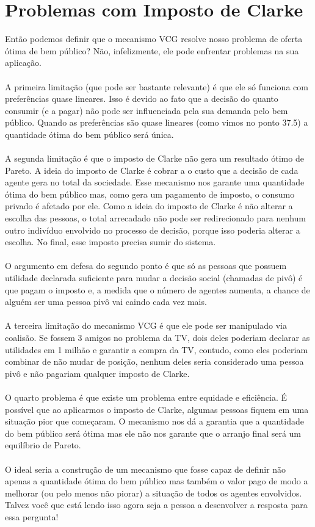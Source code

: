\documentclass[a4paper,11pt,oneside]{book}
\theoremstyle{definition}
\theoremstyle{break}
\begin{document}
\section{Problemas com Imposto de Clarke}

Então podemos definir que o mecanismo VCG resolve nosso problema de oferta ótima de bem público? Não, infelizmente, ele pode enfrentar problemas na sua aplicação.
\\~\\
A primeira limitação (que pode ser bastante relevante) é que ele só funciona com preferências quase lineares. Isso é devido ao fato que a decisão do quanto consumir (e a pagar) não pode ser influenciada pela sua demanda pelo bem público. Quando as preferências são quase lineares (como vimos no ponto 37.5) a quantidade ótima do bem público será única.
\\~\\
A segunda limitação é que o imposto de Clarke não gera um resultado ótimo de Pareto. A ideia do imposto de Clarke é cobrar a o custo que a decisão de cada agente gera no total da sociedade. Esse mecanismo nos garante uma quantidade ótima do bem público mas, como gera um pagamento de imposto, o consumo privado é afetado por ele. Como a ideia do imposto de Clarke é não alterar a escolha das pessoas, o total arrecadado não pode ser redirecionado para nenhum outro indivíduo envolvido no processo de decisão, porque isso poderia alterar a escolha. No final, esse imposto precisa sumir do sistema.
\\~\\
O argumento em defesa do segundo ponto é que só as pessoas que possuem utilidade declarada suficiente para mudar a decisão social (chamadas de pivô) é que pagam o imposto e, a medida que o número de agentes aumenta, a chance de alguém ser uma pessoa pivô vai caindo cada vez mais.
\\~\\
A terceira limitação do mecanismo VCG é que ele pode ser manipulado via coalisão. Se fossem 3 amigos no problema da TV, dois deles poderiam declarar as utilidades em 1 milhão e garantir a compra da TV, contudo, como eles poderiam combinar de não mudar de posição, nenhum deles seria considerado uma pessoa pivô e não pagariam qualquer imposto de Clarke.
\\~\\
O quarto problema é que existe um problema entre equidade e eficiência. É possível que ao aplicarmos o imposto de Clarke, algumas pessoas fiquem em uma situação pior que começaram. O mecanismo nos dá a garantia que a quantidade do bem público será ótima mas ele não nos garante que o arranjo final será um equilíbrio de Pareto.
\\~\\
O ideal seria a construção de um mecanismo que fosse capaz de definir não apenas a quantidade ótima do bem público mas também o valor pago de modo a melhorar (ou pelo menos não piorar) a situação de todos os agentes envolvidos. Talvez você que está lendo isso agora seja a pessoa a desenvolver a resposta para essa pergunta!
\end{document}
